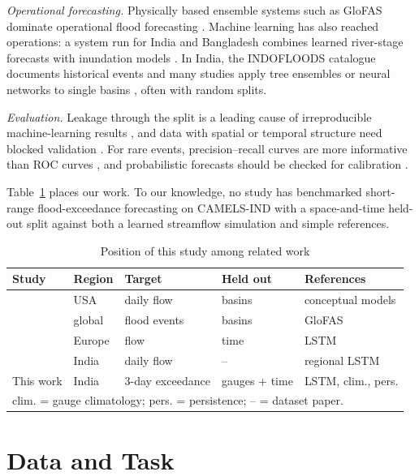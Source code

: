 \documentclass[conference]{IEEEtran}
\begin{document}
\textit{Operational forecasting.} Physically based ensemble systems such as GloFAS \cite{Alfieri2013} dominate operational flood forecasting \cite{Cloke2009}. Machine learning has also reached operations: a system run for India and Bangladesh combines learned river-stage forecasts with inundation models \cite{Nevo2022}. In India, the INDOFLOODS catalogue documents historical events \cite{Kuntla2025} and many studies apply tree ensembles or neural networks to single basins \cite{Mosavi2018}, often with random splits.

\textit{Evaluation.} Leakage through the split is a leading cause of irreproducible machine-learning results \cite{Kapoor2023}, and data with spatial or temporal structure need blocked validation \cite{Roberts2017}. For rare events, precision--recall curves are more informative than ROC curves \cite{Saito2015}, and probabilistic forecasts should be checked for calibration \cite{Brier1950}.

Table~\ref{tab:pos} places our work. To our knowledge, no study has benchmarked short-range flood-exceedance forecasting on CAMELS-IND with a space-and-time held-out split against both a learned streamflow simulation and simple references.

\begin{table}[t]
\caption{Position of this study among related work}
\label{tab:pos}
\centering
\footnotesize
\setlength{\tabcolsep}{2.2pt}
\begin{tabular}{lllll}
\toprule
Study & Region & Target & Held out & References\\
\midrule
\cite{Kratzert2019b} & USA & daily flow & basins & conceptual models\\
\cite{Nearing2024} & global & flood events & basins & GloFAS\\
\cite{Kirschstein2024} & Europe & flow & time & LSTM\\
\cite{Mangukiya2025} & India & daily flow & -- & regional LSTM\\
This work & India & 3-day exceedance & gauges + time & LSTM, clim., pers.\\
\bottomrule
\multicolumn{5}{l}{\scriptsize clim. = gauge climatology; pers. = persistence; -- = dataset paper.}\\
\end{tabular}
\end{table}

\section{Data and Task}
\end{document}
